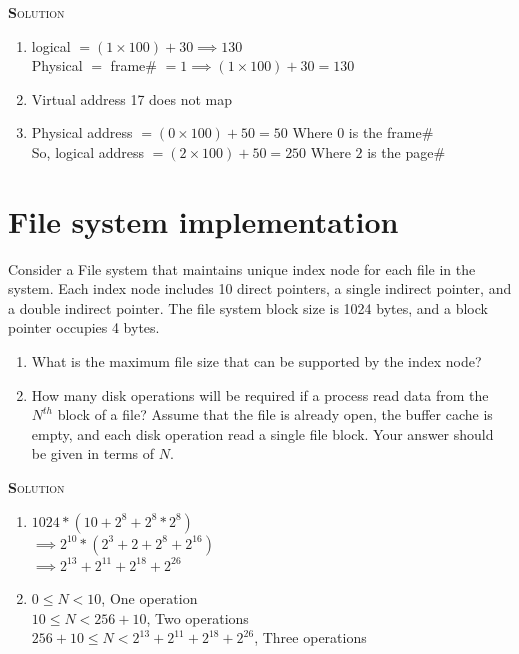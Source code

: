 \documentclass{article}
\newcommand{\smallcaps}[1]{\textsc{\textbf #1}\\}
\begin{document}
\begin{multicols}{2}
    \smallcaps{Solution}

    \begin{enumerate}
      \item logical $= (1 \times 100) + 30 \implies 130$ \\
        Physical $=$ frame\# $= 1 \implies (1 \times 100) + 30 = 130$
      \item Virtual address 17 does not map
      \item Physical address $= (0 \times 100) + 50 = 50$ Where $0$ is the frame\# \\
        So, logical address $= (2 \times 100) + 50 = 250$ Where $2$ is the page\#
    \end{enumerate}

    \section*{File system implementation}
    Consider a File system that maintains unique index node for each
    file in the system. Each index node includes 10 direct pointers, a single indirect pointer,
    and a double indirect pointer. The file system block size is 1024 bytes, and a block pointer
    occupies 4 bytes.

    \begin{enumerate}
      \item What is the maximum file size that can be supported by the index node?
      \item How many disk operations will be required if a process read data from the $N^{th}$ block
        of a file? Assume that the file is already open, the buffer cache is empty, and each disk
        operation read a single file block. Your answer should be given in terms of $N$.
    \end{enumerate}

    \smallcaps{Solution}

    \begin{enumerate}
      \item $1024 * (10 + 2^8 + 2^8 * 2^8)$ \\
        $\implies 2^{10} * (2^3 + 2 + 2^8 + 2^{16})$ \\
        $\implies 2^{13} + 2^{11} + 2^{18} + 2^{26}$ \\
      \item $0 \le N < 10$, One operation \\
        $10 \le N < 256 + 10$, Two operations \\
        $256 + 10 \le N < 2^{13} + 2^{11} + 2^{18} + 2^{26}$, Three operations
    \end{enumerate}


\end{multicols}
\end{document}
